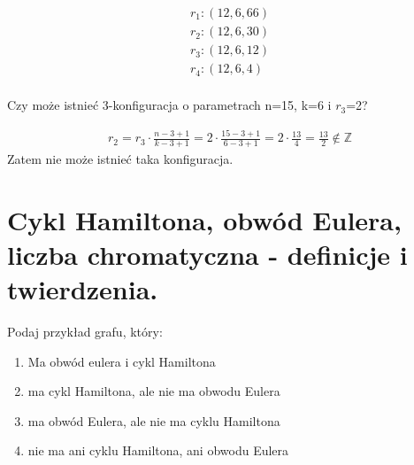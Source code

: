 \documentclass[12pt]{article}
\begin{document}
    \begin{align*}
        r_1: (12,6,66) \\
        r_2: (12,6,30) \\
        r_3: (12,6,12) \\
        r_4: (12,6,4) \\
    \end{align*}

    \begin{exercise}
        Czy może istnieć 3-konfiguracja o parametrach n=15, k=6 i $r_3$=2?
    \end{exercise}

    \begin{align*}
        r_2=r_3\cdot \frac{n-3+1}{k-3+1}=2\cdot \frac{15-3+1}{6-3+1}=2\cdot \frac{13}{4}=\frac{13}{2}\notin \mathbb{Z}
    \end{align*}
    Zatem nie może istnieć taka konfiguracja.


    \newpage

    \section{Cykl Hamiltona, obwód Eulera, liczba chromatyczna - definicje i twierdzenia.}

    \begin{exercise}
        Podaj przykład grafu, który:
        \begin{enumerate}
            \item Ma obwód eulera i cykl Hamiltona
            \item ma cykl Hamiltona, ale nie ma obwodu Eulera
            \item ma obwód Eulera, ale nie ma cyklu Hamiltona
            \item nie ma ani cyklu Hamiltona, ani obwodu Eulera
        \end{enumerate}
    \end{exercise}
\end{document}

